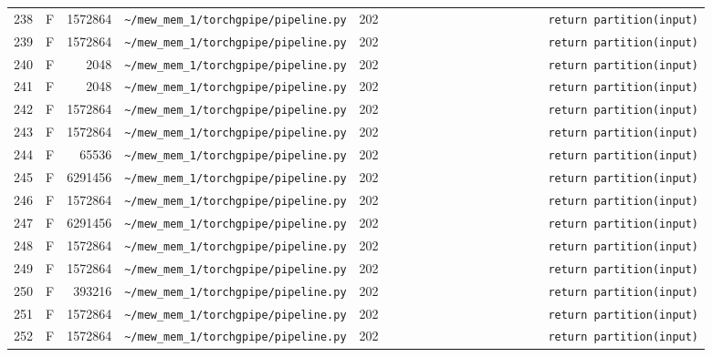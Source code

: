 \documentclass{article}
\begin{document}
\begin{longtable}{r l r p{6.5cm} r p{7.0cm}}
238 & F & 1572864 & \lstinline|~/mew_mem_1/torchgpipe/pipeline.py| & 202 & \lstinline|                        return partition(input)| \\
239 & F & 1572864 & \lstinline|~/mew_mem_1/torchgpipe/pipeline.py| & 202 & \lstinline|                        return partition(input)| \\
240 & F & 2048 & \lstinline|~/mew_mem_1/torchgpipe/pipeline.py| & 202 & \lstinline|                        return partition(input)| \\
241 & F & 2048 & \lstinline|~/mew_mem_1/torchgpipe/pipeline.py| & 202 & \lstinline|                        return partition(input)| \\
242 & F & 1572864 & \lstinline|~/mew_mem_1/torchgpipe/pipeline.py| & 202 & \lstinline|                        return partition(input)| \\
243 & F & 1572864 & \lstinline|~/mew_mem_1/torchgpipe/pipeline.py| & 202 & \lstinline|                        return partition(input)| \\
244 & F & 65536 & \lstinline|~/mew_mem_1/torchgpipe/pipeline.py| & 202 & \lstinline|                        return partition(input)| \\
245 & F & 6291456 & \lstinline|~/mew_mem_1/torchgpipe/pipeline.py| & 202 & \lstinline|                        return partition(input)| \\
246 & F & 1572864 & \lstinline|~/mew_mem_1/torchgpipe/pipeline.py| & 202 & \lstinline|                        return partition(input)| \\
247 & F & 6291456 & \lstinline|~/mew_mem_1/torchgpipe/pipeline.py| & 202 & \lstinline|                        return partition(input)| \\
248 & F & 1572864 & \lstinline|~/mew_mem_1/torchgpipe/pipeline.py| & 202 & \lstinline|                        return partition(input)| \\
249 & F & 1572864 & \lstinline|~/mew_mem_1/torchgpipe/pipeline.py| & 202 & \lstinline|                        return partition(input)| \\
250 & F & 393216 & \lstinline|~/mew_mem_1/torchgpipe/pipeline.py| & 202 & \lstinline|                        return partition(input)| \\
251 & F & 1572864 & \lstinline|~/mew_mem_1/torchgpipe/pipeline.py| & 202 & \lstinline|                        return partition(input)| \\
252 & F & 1572864 & \lstinline|~/mew_mem_1/torchgpipe/pipeline.py| & 202 & \lstinline|                        return partition(input)| \\

\end{longtable}
\end{document}
